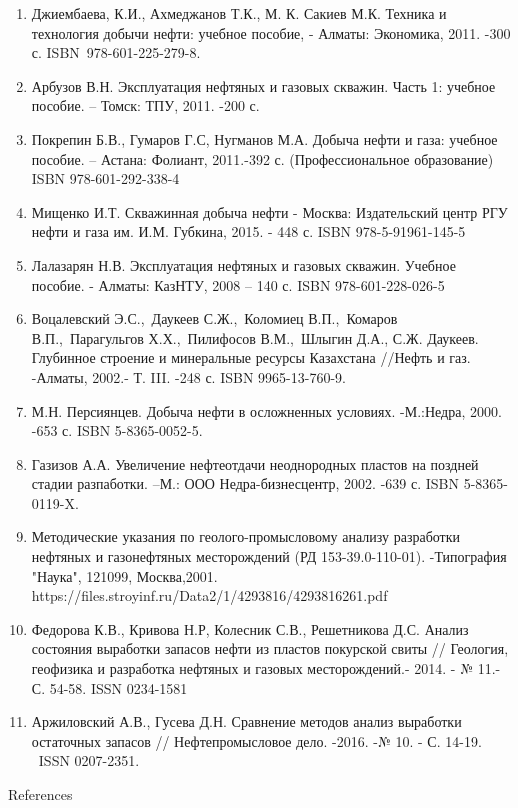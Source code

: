 \begin{enumerate}
\def\labelenumi{\arabic{enumi}.}
\setcounter{enumi}{3}
\item
  Джиембаева, К.И., Ахмеджанов Т.К., М. К. Сакиев М.К. Техника и
  технология добычи нефти: учебное пособие, - Алматы: Экономика, 2011.
  -300 с. ISBN~978-601-225-279-8.
\item
  Арбузов В.Н. Эксплуатация нефтяных и газовых скважин. Часть 1: учебное
  пособие. -- Томск: ТПУ, 2011. -200 с.
\item
  Покрепин Б.В., Гумаров Г.С, Нугманов М.А. Добыча нефти и газа: учебное
  пособие. -- Астана: Фолиант, 2011.-392 с. (Профессиональное
  образование) ISBN 978-601-292-338-4~
\item
  Мищенко И.Т. Скважинная добыча нефти - Москва: Издательский центр РГУ
  нефти и газа им. И.М. Губкина, 2015. - 448 с. ISBN 978-5-91961-145-5
\item
  Лалазарян Н.В. Эксплуатация нефтяных и газовых скважин. Учебное
  пособие. - Алматы: КазНТУ, 2008 -- 140 с. ISBN 978-601-228-026-5
\item
  Воцалевский Э.С.,~Даукеев С.Ж.,~Коломиец В.П.,~Комаров
  В.П.,~Парагульгов Х.Х.,~Пилифосов В.М.,~Шлыгин Д.А., С.Ж. Даукеев.
  Глубинное строение и минеральные ресурсы Казахстана //Нефть и газ.
  -Алматы, 2002.- Т. III. -248 с. ISBN 9965-13-760-9.
\item
  М.Н. Персиянцев. Добыча нефти в осложненных условиях. -М.:Недра, 2000.
  -653 с. ISBN 5-8365-0052-5.
\item
  Газизов А.А. Увеличение нефтеотдачи неоднородных пластов на поздней
  стадии разпаботки. --М.: ООО Недра-бизнесцентр, 2002. -639 с. ISBN
  5-8365-0119-X.
\item
  Методические указания по геолого-промысловому анализу разработки
  нефтяных и газонефтяных месторождений (РД 153-39.0-110-01).
  -Типография "Наука", 121099, Москва,2001.
  https://files.stroyinf.ru/Data2/1/4293816/4293816261.pdf
\item
  Федорова К.В., Кривова Н.Р, Колесник С.В., Решетникова Д.С. Анализ
  состояния выработки запасов нефти из пластов покурской свиты //
  Геология, геофизика и разработка нефтяных и газовых месторождений.-
  2014. - № 11.- С. 54-58. ISSN 0234-1581
\item
  Аржиловский А.В., Гусева Д.Н. Сравнение методов анализ выработки
  остаточных запасов // Нефтепромысловое дело. -2016. -№ 10. - С. 14-19.
  ~ISSN 0207-2351.
\end{enumerate}

References

